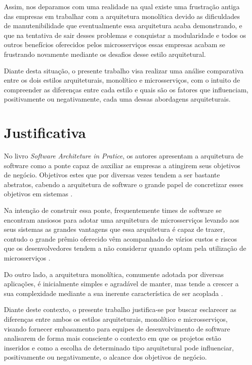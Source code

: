 Assim, nos deparamos com uma realidade na qual existe uma frustração antiga das empresas em trabalhar
com a arquitetura monolítica devido as dificuldades de manutenibilidade que eventualmente essa arquitetura
acaba demonstrando, e que na tentativa de sair desses problemas e conquistar a modularidade e todos os outros
benefícios oferecidos pelos microsserviços essas empresas acabam se frustrando novamente mediante os desafios
desse estilo arquitetural.

Diante desta situação, o presente trabalho visa realizar uma análise comparativa entre os dois estilos
arquiteturais, monolítico e microsserviços, com o intuito de compreender as diferenças entre cada estilo
e quais são os fatores que influenciam, positivamente ou negativamente, cada uma dessas abordagens
arquiteturais.

\section{Justificativa}
\label{justificativa}

No livro \textit{Software Architeture in Pratice}, os autores 
apresentam a arquitetura de software como a ponte capaz de auxiliar as empresas a atingirem seus
objetivos de negócio. Objetivos estes que por diversas vezes tendem a ser bastante abstratos,
cabendo a arquitetura de software o grande papel de concretizar esses objetivos em sistemas
\cite{Bass2015:SoftwareArchitetureInPratice}.

Na intenção de construir essa ponte, frequentemente times de software se encontram ansiosos para
adotar uma arquitetura de microsserviços levando aos seus sistemas as grandes vantagens que essa
arquitetura é capaz de trazer, contudo o grande prêmio oferecido vêm acompanhado de vários custos e
riscos que os desenvolvedores tendem a não considerar quando optam pela utilização de
microsserviços \cite{MartinFowler:MicroservicePremium}.

Do outro lado, a arquitetura monolítica, comumente adotada por diversas aplicações, é inicialmente
simples e agradável de manter, mas tende a crescer a sua complexidade mediante a sua inerente
característica de ser acoplada \cite{StefanTilkov:DontStartWithAMonolith}.

Diante deste contexto, o presente trabalho justifica-se por buscar esclarecer as diferenças entre
ambos os estilos arquiteturais, monolítico e microsserviços, visando fornecer embasamento para equipes
de desenvolvimento de software analisarem de forma mais consciente o contexto em que os projetos
estão inseridos e como a escolha de determinado tipo arquitetural pode influenciar, positivamente ou
negativamente, o alcance dos objetivos de negócio.

